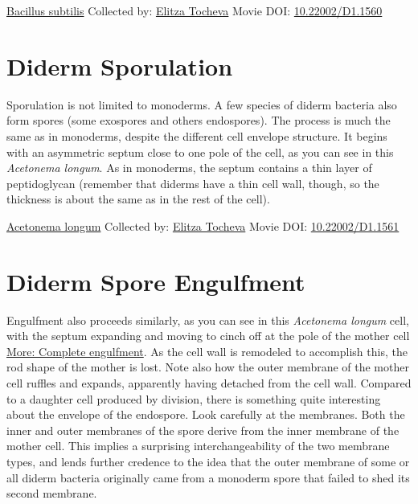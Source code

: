 \documentclass[]{tufte-book}
\begin{document}
\hypertarget{htmlwidget-105a817bf49cca10a5e3}{}

\label{fig:8-8}\protect\hyperlink{tree}{Bacillus subtilis} Collected by: \protect\hyperlink{elitza_tocheva}{Elitza Tocheva} Movie DOI: \href{https://doi.org/10.22002/D1.1560}{10.22002/D1.1560}

\hypertarget{diderm-sporulation}{%
\section{Diderm Sporulation}\label{diderm-sporulation}}

Sporulation is not limited to monoderms. A few species of diderm bacteria also form spores (some exospores and others endospores). The process is much the same as in monoderms, despite the different cell envelope structure. It begins with an asymmetric septum close to one pole of the cell, as you can see in this \emph{Acetonema longum}. As in monoderms, the septum contains a thin layer of peptidoglycan (remember that diderms have a thin cell wall, though, so the thickness is about the same as in the rest of the cell).



\hypertarget{htmlwidget-7a6bc8dffc4b537c3aec}{}

\label{fig:8-9}\protect\hyperlink{tree}{Acetonema longum} Collected by: \protect\hyperlink{elitza_tocheva}{Elitza Tocheva} Movie DOI: \href{https://doi.org/10.22002/D1.1561}{10.22002/D1.1561}

\hypertarget{diderm-spore-engulfment}{%
\section{Diderm Spore Engulfment}\label{diderm-spore-engulfment}}

Engulfment also proceeds similarly, as you can see in this \emph{Acetonema longum} cell, with the septum expanding and moving to cinch off at the pole of the mother cell \protect\hyperlink{Complete_engulfment}{More: Complete engulfment}. As the cell wall is remodeled to accomplish this, the rod shape of the mother is lost. Note also how the outer membrane of the mother cell ruffles and expands, apparently having detached from the cell wall. Compared to a daughter cell produced by division, there is something quite interesting about the envelope of the endospore. Look carefully at the membranes. Both the inner and outer membranes of the spore derive from the inner membrane of the mother cell. This implies a surprising interchangeability of the two membrane types, and lends further credence to the idea that the outer membrane of some or all diderm bacteria originally came from a monoderm spore that failed to shed its second membrane.
\end{document}
